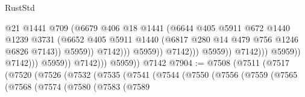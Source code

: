 \begin{lexlean}{RustStd}
\begin{coremodule}
                                                      @21
                                                      @1441
                                                      @709
                                                      (@6679
                                                        @406
                                                        @18
                                                        @1441
                                                        (@6644
                                                          @405
                                                          @5911
                                                          @672
                                                          @1440
                                                          @1239
                                                          @3731
                                                          (@6652
                                                            @405
                                                            @5911
                                                            @1440
                                                            (@6817
                                                              @280
                                                              @14
                                                              @479
                                                              @756
                                                              @1246
                                                              @6826
                                                              @7143))
                                                          @5959))
                                                      @7142)))
                                                @5959))
                                            @7142)))
                                      @5959))
                                  @7142)))
                            @5959))
                        @7142)))
                  @5959))
              @7142)))
        @5959))
    @7142
@7904 := @7508
    (@7511
      (@7517
        (@7520
          (@7526
            (@7532
              (@7535
                (@7541
                  (@7544
                    (@7550
                      (@7556
                        (@7559
                          (@7565
                            (@7568
                              (@7574
                                (@7580
                                  (@7583
                                    (@7589

\end{coremodule}
\end{lexlean}
